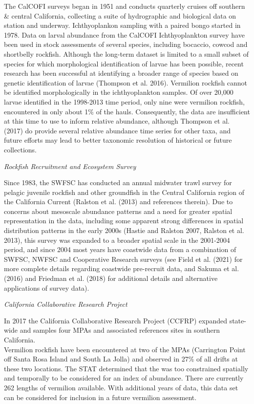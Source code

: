 \documentclass[
  english,
  a4paper,
]{article}
\begin{document}
The CalCOFI surveys began in 1951 and conducts quarterly cruises off southern \&
central California, collecting a suite of hydrographic and biological data on
station and underway. Ichthyoplankon sampling with a paired bongo started in 1978.
Data on larval abundance from the CalCOFI Ichthyoplankton survey have been used in
stock assessments of several species, including bocaccio, cowcod and shortbelly
rockfish. Although the long-term dataset is limited to a small subset of species
for which morphological identification of larvae has been possible, recent research
has been successful at identifying a broader range of species based on genetic
identification of larvae (Thompson et al. 2016).
Vermilion rockfish cannot be identified morphologically in the ichthyoplankton
samples. Of over 20,000 larvae identified in the 1998-2013 time period, only nine
were vermilion rockfish, encountered in only about 1\% of the hauls. Consequently,
the data are insufficient at this time to use to inform relative abundance, although Thompson et al. (2017) do provide several relative abundance time series for other taxa, and
future efforts may lead to better taxonomic resolution of historical or future collections.

\emph{Rockfish Recruitment and Ecosystem Survey}

Since 1983, the SWFSC has conducted an annual midwater trawl survey for pelagic
juvenile rockfish and other groundfish in the Central California region of the
California Current (Ralston et al. (2013) and references therein). Due to concerns
about mesoscale abundance patterns and a need for greater spatial representation
in the data, including some apparent strong differences in spatial distribution
patterns in the early 2000s (Hastie and Ralston 2007, Ralston et al. 2013), this survey was expanded
to a broader spatial scale in the 2001-2004 period, and since 2004 most years have
coastwide data from a combination of SWFSC, NWFSC and Cooperative Research surveys
(see Field et al. (2021) for more complete details regarding coastwide
pre-recruit data, and Sakuma et al. (2016) and Friedman et al. (2018)
for additional details and alternative applications of survey data).

\emph{California Collaborative Research Project}

In 2017 the California Collaborative Research Project (CCFRP) expanded state-wide
and samples four MPAs and associated references sites in southern California.\\
Vermilion rockfish have been encountered at two of the MPAs (Carrington Point off
Santa Rosa Island and South La Jolla) and observed in 27\% of all drifts at these
two locations. The STAT determined that the was too constrained spatially and
temporally to be considered
for an index of abundance. There are currently 262 lengths of vermilion available.
With additional years of data, this data set can be considered for inclusion in a
future vermilion assessment.
\end{document}
